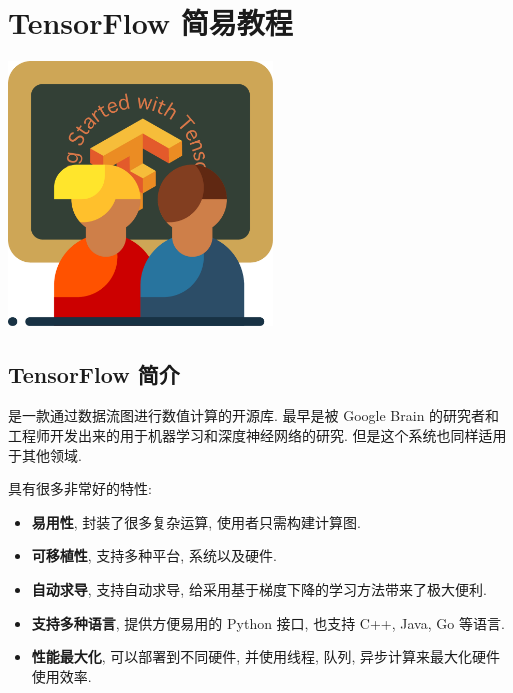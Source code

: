 
\section{TensorFlow 简易教程}
\begin{frame}{\secname}
\vfill\hspace{20pt}
\begin{minipage}[m]{0.35\textwidth}
  \linespread{1}\large
  \tableofcontents[sectionstyle = hide/hide, subsectionstyle = show/show/hide]
\end{minipage}%
\hfill%
\begin{minipage}[m]{0.5\textwidth}
  \includegraphics[height = 7cm]{./icons/lesson.pdf}
\end{minipage}%
\vfill
\end{frame}

\subsection{TensorFlow 简介}
\begin{frame}{\insertsection}{\insertsubsection}
    \tensorflow{} 是一款通过数据流图进行数值计算的开源库. \tensorflow{}  最早是被 Google Brain 的研究者和工程师开发出来的用于机器学习和深度神经网络的研究. 但是这个系统也同样适用于其他领域.

    \tensorflow{} 具有很多非常好的特性:%
    \begin{itemize}
        \item \textbf{易用性}, \tensorflow{} 封装了很多复杂运算, 使用者只需构建计算图.
        \item \textbf{可移植性}, \tensorflow{} 支持多种平台, 系统以及硬件.
        \item \textbf{自动求导}, \tensorflow{} 支持自动求导, 给采用基于梯度下降的学习方法带来了极大便利.
        \item \textbf{支持多种语言}, \tensorflow{} 提供方便易用的 Python 接口, 也支持 C++, Java, Go 等语言.
        \item \textbf{性能最大化}, 可以部署到不同硬件, 并使用线程, 队列, 异步计算来最大化硬件使用效率.
    \end{itemize}
\end{frame}

